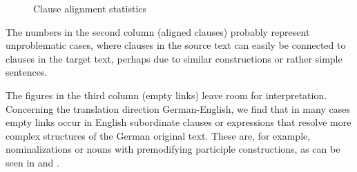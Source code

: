 \documentclass[output=paper]{LSP/langsci}
\begin{document}
\begin{figure}

\caption{Clause alignment statistics}
\label{fig:culo:clausealignment}
\end{figure}




The numbers in the second column (aligned clauses) probably represent unproblematic cases, where clauses in the source text can easily be connected to clauses in the target text, perhaps due to similar constructions or rather simple sentences. 

The figures in the third column (empty links) leave room for interpretation. Concerning the translation direction German-English, we find that in many cases empty links occur in English subordinate clauses or expressions that resolve more complex structures of the German original text. These are, for example, nominalizations or nouns with premodifying participle constructions, as can be seen in  and .
\end{document}
